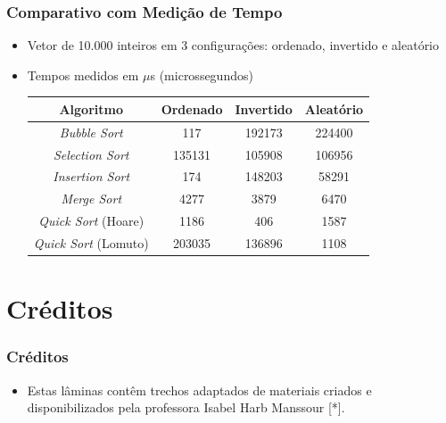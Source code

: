 \documentclass[aspectratio=169]{beamer}
\begin{document}
\begin{frame}\frametitle{Comparativo com Medição de Tempo}
\begin{itemize}
	\item Vetor de 10.000 inteiros em 3 configurações: ordenado, invertido e aleatório
	\item Tempos medidos em $\mu$s (microssegundos)
\begin{center}
\begin{tabular}{|c|c|c|c|}
\hline
\textbf{Algoritmo} & \textbf{Ordenado} & \textbf{Invertido} & \textbf{Aleatório}\\
\hline
\emph{Bubble Sort} & 117 & 192173 & 224400 \\
\hline
\emph{Selection Sort} & 135131 & 105908 & 106956\\
\hline
\emph{Insertion Sort} & 174 & 148203 & 58291\\
\hline
\emph{Merge Sort} & 4277 & 3879 & 6470\\
\hline
\emph{Quick Sort} (Hoare) & 1186 & 406 & 1587\\
\hline
\emph{Quick Sort} (Lomuto) & 203035 & 136896 & 1108\\
\hline
\end{tabular}
\end{center}
\end{itemize}
\end{frame}

\section{Créditos}

\begin{frame}\frametitle{Créditos}
\begin{itemize}
	\item Estas lâminas contêm trechos adaptados de materiais criados e disponibilizados pela professora Isabel Harb Manssour [*].
\end{itemize}
\end{frame}

\end{document}
